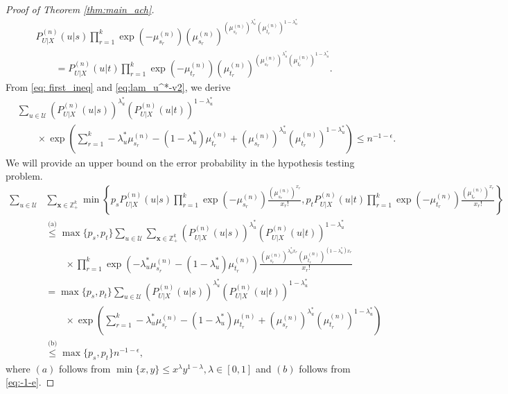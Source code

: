 \documentclass[11pt]{article}
\theoremstyle{plain}
\theoremstyle{definition}
\begin{document}
\begin{proof}[Proof of Theorem \ref{thm:main_ach}]
\begin{align}
 & P^{(n)}_{U|X}(u|s) \prod_{r=1}^k \exp(-\mu_{s_r}^{(n)}) 
(\mu_{s_r}^{(n)})^{(\mu_{s_r}^{(n)})^{\lambda_u^*} (\mu_{t_r}^{(n)})^{1-\lambda_u^*}}  \nonumber \\
 &\quad\quad  = 
P^{(n)}_{U|X}(u|t) \prod_{r=1}^k \exp(-\mu_{t_r}^{(n)}) 
(\mu_{t_r}^{(n)})^{(\mu_{s_r}^{(n)})^{\lambda_u^*} (\mu_{t_r}^{(n)})^{1-\lambda_u^*}}.
\label{eq:eq_prob}
\end{align}
From \eqref{eq: first_ineq} and \eqref{eq:lam_u^*-v2}, we derive
\begin{align}
& \sum_{u \in \mathcal{U}}
 (P^{(n)}_{U|X}(u|s))^{\lambda_u^*}  
 (P^{(n)}_{U|X}(u|t))^{1-\lambda_u^*} \nonumber \\
&\quad\quad \times\exp\left(
 \sum_{r=1}^k  -\lambda_u^* \mu_{s_r}^{(n)} - 
(1-\lambda_u^*) \mu_{t_r}^{(n)}  + (\mu_{s_r}^{(n)})^{\lambda_u^*} (\mu_{t_r}^{(n)})^{1-\lambda_u^*}
\right)  \le  n^{-1-\epsilon}.
\label{eq:-1-e}
\end{align}
We will provide an upper bound on the error probability in the hypothesis testing problem.
\begin{align*}
   \sum_{u \in \mathcal{U}}  & \sum_{\mathbf{x} \in \mathbb{Z}^k_+} 
 	\min\left\{
	p_s P^{(n)}_{U|X}(u|s) \prod_{r=1}^k \exp(-\mu_{s_r}^{(n)} )\frac{ (\mu_{s_r}^{(n)})^{x_r}}{x_r !} , 
	p_t P^{(n)}_{U|X}(u|t) \prod_{r=1}^k \exp(-\mu_{t_r}^{(n)} )\frac{ (\mu_{t_r}^{(n)})^{x_r}}{x_r !}
	\right\} \\
& \overset{\text{(a)}}{\le}
\max\{p_s,p_t\}\sum_{u \in \mathcal{U}}  \sum_{\mathbf{x} \in \mathbb{Z}^k_+} 
(P^{(n)}_{U|X}(u|s))^{\lambda_u^*}  
 (P^{(n)}_{U|X}(u|t))^{1-\lambda_u^*} \nonumber \\
&\quad\quad \times \prod_{r=1}^k \exp( -\lambda_u^* \mu_{s_r}^{(n)} - 
(1-\lambda_u^*) \mu_{t_r}^{(n)}) 
\frac{  (\mu_{s_r}^{(n)})^{\lambda_u^* x_r} (\mu_{t_r}^{(n)})^{(1-\lambda_u^*) x_r}
 }{x_r!} \\
& =
 \max\{p_s,p_t\} \sum_{u \in \mathcal{U}}
 (P^{(n)}_{U|X}(u|s))^{\lambda_u^*}  
 (P^{(n)}_{U|X}(u|t))^{1-\lambda_u^*} \nonumber \\ 
&\quad\quad \times \exp\left(  \sum_{r=1}^k 
 -\lambda_u^* \mu_{s_r}^{(n)} - 
(1-\lambda_u^*) \mu_{t_r}^{(n)} + (\mu_{s_r}^{(n)})^{\lambda_u^*} (\mu_{t_r}^{(n)})^{1-\lambda_u^*}
 \right) \\
 & \overset{\text{(b)}}{\le}
 \max\{p_s,p_t\} n^{-1 -\epsilon },
\end{align*}
where $(a)$ follows from $\min\{x,y\} \le x^\lambda y ^{1-\lambda} , \lambda \in [0,1]$
and $(b)$ follows from \eqref{eq:-1-e}. 
 

\end{proof}
\end{document}
